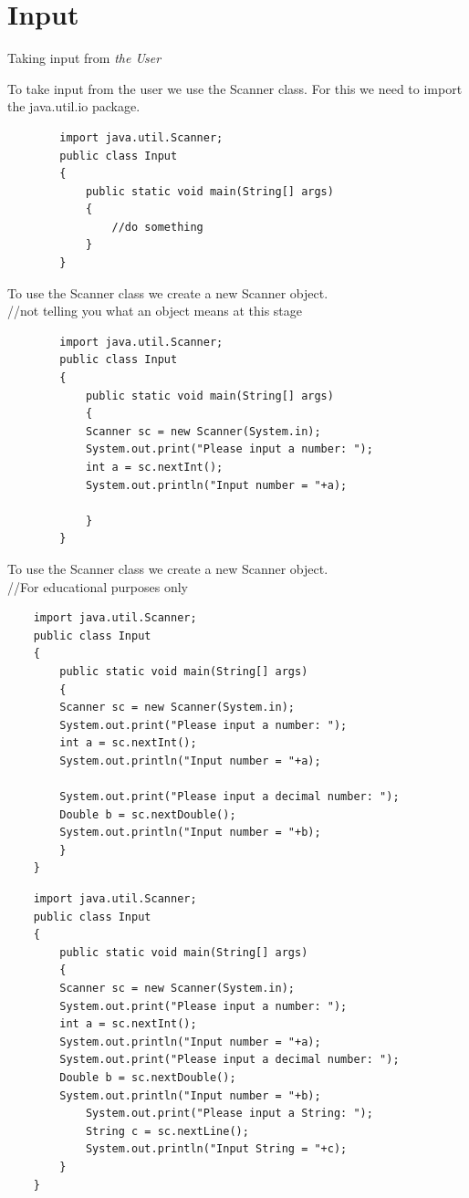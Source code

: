 \section{Input}
\begin{frame}{Taking input from \emph{the User} }
	
	To take input from the user we use the Scanner class. 
	For this we need to import the java.util.io package. 
	
	\begin{lstlisting}
		import java.util.Scanner; 
		public class Input
		{
			public static void main(String[] args)
			{
				//do something
			}
		}
	\end{lstlisting}
\framebreak

	To use the Scanner class we create a new Scanner object.\\
	//not telling you what an object means at this stage
	
	\begin{lstlisting}
		import java.util.Scanner; 
		public class Input
		{
			public static void main(String[] args)
			{
			Scanner sc = new Scanner(System.in);
			System.out.print("Please input a number: ");
			int a = sc.nextInt();
			System.out.println("Input number = "+a);
				
			}
		}
	\end{lstlisting}

\framebreak

To use the Scanner class we create a new Scanner object.\\
//For educational purposes only

\begin{lstlisting}
	import java.util.Scanner; 
	public class Input
	{
		public static void main(String[] args)
		{
		Scanner sc = new Scanner(System.in);
		System.out.print("Please input a number: ");
		int a = sc.nextInt();
		System.out.println("Input number = "+a);
		
		System.out.print("Please input a decimal number: ");
		Double b = sc.nextDouble();
		System.out.println("Input number = "+b);
		}
	}
\end{lstlisting}

\framebreak

\begin{lstlisting}
	import java.util.Scanner; 
	public class Input
	{
		public static void main(String[] args)
		{
		Scanner sc = new Scanner(System.in);
		System.out.print("Please input a number: ");
		int a = sc.nextInt();
		System.out.println("Input number = "+a);
		System.out.print("Please input a decimal number: ");
		Double b = sc.nextDouble();
		System.out.println("Input number = "+b);
			System.out.print("Please input a String: ");
			String c = sc.nextLine();
			System.out.println("Input String = "+c);	
		}
	}
\end{lstlisting}

\end{frame}



